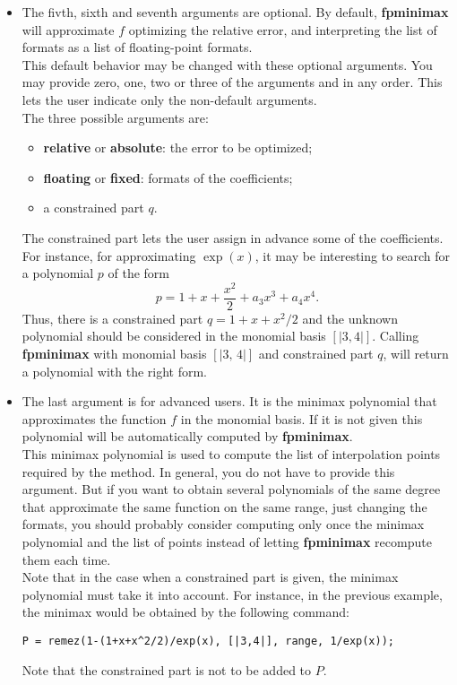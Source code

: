 \begin{itemize}
\item The fivth, sixth and seventh arguments are optional. By default, \textbf{fpminimax}
   will approximate $f$ optimizing the relative error, and interpreting
   the list of formats as a list of floating-point formats.\\
   This default behavior may be changed with these optional arguments. You
   may provide zero, one, two or three of the arguments and in any order.
   This lets the user indicate only the non-default arguments.\\
   The three possible arguments are: \begin{itemize}
   \item \textbf{relative} or \textbf{absolute}: the error to be optimized;
   \item \textbf{floating} or \textbf{fixed}: formats of the coefficients;
   \item a constrained part $q$.
   \end{itemize}
   The constrained part lets the user assign in advance some of the
   coefficients. For instance, for approximating $\exp(x)$, it may
   be interesting to search for a polynomial $p$ of the form
                   $$p = 1 + x + \frac{x^2}{2} + a_3 x^3 + a_4 x^4.$$
   Thus, there is a constrained part $q = 1 + x + x^2/2$ and the unknown
   polynomial should be considered in the monomial basis $[|3, 4|]$.
   Calling \textbf{fpminimax} with monomial basis $[|3,\,4|]$ and constrained
   part $q$, will return a polynomial with the right form.

\item The last argument is for advanced users. It is the minimax polynomial that
   approximates the function $f$ in the monomial basis. If it is not given
   this polynomial will be automatically computed by \textbf{fpminimax}.
   \\
   This minimax polynomial is used to compute the list of interpolation
   points required by the method. In general, you do not have to provide this
   argument. But if you want to obtain several polynomials of the same degree
   that approximate the same function on the same range, just changing the
   formats, you should probably consider computing only once the minimax
   polynomial and the list of points instead of letting \textbf{fpminimax} recompute
   them each time.
   \\
   Note that in the case when a constrained part is given, the minimax 
   polynomial must take it into account. For instance, in the previous
   example, the minimax would be obtained by the following command:
          \begin{center}\verb~P = remez(1-(1+x+x^2/2)/exp(x), [|3,4|], range, 1/exp(x));~\end{center}
   Note that the constrained part is not to be added to $P$.


\end{itemize}
